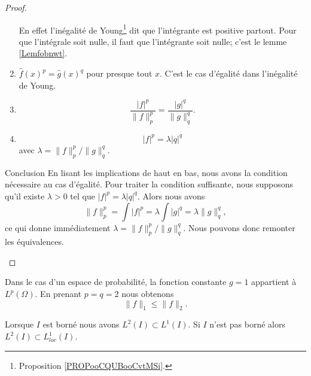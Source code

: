 \begin{proof}
\begin{subproof}
\begin{subproof}
\begin{enumerate}
                En effet l'inégalité de Young\footnote{Proposition \ref{PROPooCQUBooCvtMSi}.} dit que l'intégrante est positive partout. Pour que l'intégrale soit nulle, il faut que l'intégrante soit nulle; c'est le lemme \ref{Lemfobnwt}.
            \item \( \hat f(x)^p=\hat g(x)^q\) pour presque tout \( x\). C'est le cas d'égalité dans l'inégalité de Young.
            \item
                \begin{equation}
                    \frac{ | f |^p }{ \| f \|_p^p }=\frac{ | g |^q }{ \| g \|_q^q }.
                \end{equation}
            \item
                \begin{equation}
                    | f |^p=\lambda | q |^q
                \end{equation}
                avec \( \lambda=\| f \|_p^p/\| g \|_q^q\).
        \end{enumerate}
    \item[Conclusion]
        En lisant les implications de haut en bas, nous avons la condition nécessaire au cas d'égalité. Pour traiter la condition suffisante, nous supposons qu'il existe \( \lambda>0\) tel que \( | f |^p=\lambda| q |^q\). Alors nous avons
        \begin{equation}
            \| f \|_p^p=\int| f |^p=\lambda\int| g |^q=\lambda\| g \|_q^q,
        \end{equation}
        ce qui donne immédiatement \( \lambda=\| f \|_p^p/\| g \|_q^q\). Nous pouvons donc remonter les équivalences.
    \end{subproof}
    \end{subproof}
\end{proof}


\begin{remark}      \label{RemNormuptNird}
    Dans le cas d'un espace de probabilité, la fonction constante \( g=1\) appartient à \( L^p(\Omega)\). En prenant \( p=q=2\) nous obtenons
    \begin{equation}
        \| f \|_1\leq\| f \|_2.
    \end{equation}
\end{remark}

\begin{lemma}   \label{LemTLHwYzD}
    Lorsque \( I\) est borné nous avons \( L^2(I)\subset L^1(I)\). Si \( I\) n'est pas borné alors \( L^2(I)\subset L^1_{loc}(I)\).
\end{lemma}

